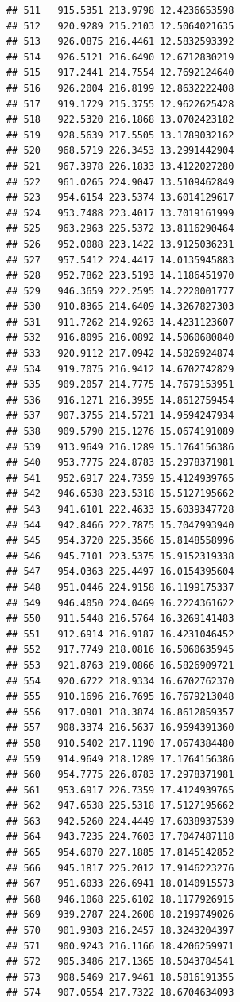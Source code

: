\documentclass[
]{article}
\begin{document}
\begin{verbatim}
## 511   915.5351 213.9798 12.4236653598
## 512   920.9289 215.2103 12.5064021635
## 513   926.0875 216.4461 12.5832593392
## 514   926.5121 216.6490 12.6712830219
## 515   917.2441 214.7554 12.7692124640
## 516   926.2004 216.8199 12.8632222408
## 517   919.1729 215.3755 12.9622625428
## 518   922.5320 216.1868 13.0702423182
## 519   928.5639 217.5505 13.1789032162
## 520   968.5719 226.3453 13.2991442904
## 521   967.3978 226.1833 13.4122027280
## 522   961.0265 224.9047 13.5109462849
## 523   954.6154 223.5374 13.6014129617
## 524   953.7488 223.4017 13.7019161999
## 525   963.2963 225.5372 13.8116290464
## 526   952.0088 223.1422 13.9125036231
## 527   957.5412 224.4417 14.0135945883
## 528   952.7862 223.5193 14.1186451970
## 529   946.3659 222.2595 14.2220001777
## 530   910.8365 214.6409 14.3267827303
## 531   911.7262 214.9263 14.4231123607
## 532   916.8095 216.0892 14.5060680840
## 533   920.9112 217.0942 14.5826924874
## 534   919.7075 216.9412 14.6702742829
## 535   909.2057 214.7775 14.7679153951
## 536   916.1271 216.3955 14.8612759454
## 537   907.3755 214.5721 14.9594247934
## 538   909.5790 215.1276 15.0674191089
## 539   913.9649 216.1289 15.1764156386
## 540   953.7775 224.8783 15.2978371981
## 541   952.6917 224.7359 15.4124939765
## 542   946.6538 223.5318 15.5127195662
## 543   941.6101 222.4633 15.6039347728
## 544   942.8466 222.7875 15.7047993940
## 545   954.3720 225.3566 15.8148558996
## 546   945.7101 223.5375 15.9152319338
## 547   954.0363 225.4497 16.0154395604
## 548   951.0446 224.9158 16.1199175337
## 549   946.4050 224.0469 16.2224361622
## 550   911.5448 216.5764 16.3269141483
## 551   912.6914 216.9187 16.4231046452
## 552   917.7749 218.0816 16.5060635945
## 553   921.8763 219.0866 16.5826909721
## 554   920.6722 218.9334 16.6702762370
## 555   910.1696 216.7695 16.7679213048
## 556   917.0901 218.3874 16.8612859357
## 557   908.3374 216.5637 16.9594391360
## 558   910.5402 217.1190 17.0674384480
## 559   914.9649 218.1289 17.1764156386
## 560   954.7775 226.8783 17.2978371981
## 561   953.6917 226.7359 17.4124939765
## 562   947.6538 225.5318 17.5127195662
## 563   942.5260 224.4449 17.6038937539
## 564   943.7235 224.7603 17.7047487118
## 565   954.6070 227.1885 17.8145142852
## 566   945.1817 225.2012 17.9146223276
## 567   951.6033 226.6941 18.0140915573
## 568   946.1068 225.6102 18.1177926915
## 569   939.2787 224.2608 18.2199749026
## 570   901.9303 216.2457 18.3243204397
## 571   900.9243 216.1166 18.4206259971
## 572   905.3486 217.1365 18.5043784541
## 573   908.5469 217.9461 18.5816191355
## 574   907.0554 217.7322 18.6704634093

\end{verbatim}
\end{document}
